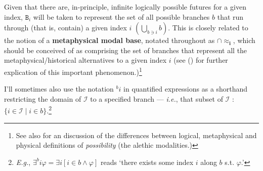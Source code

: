 \documentclass[12pt,dvipsnames]{report}
\begin{document}
\xe


Given that there are, in-principle, infinite logically possible futures for a given index,  $ \mathtt{B}_i $ will be taken to represent the set of all possible branches $ b $ that run through (that is, contain) a given index $ i $ $(\bigcup\limits_{b\scriptstyle\ni i}b)$. This is closely related to the notion of a \textbf{metaphysical modal base}, notated throughout as $ \boldsymbol{\cap{\approx_i}} $, which should be conceived of as comprising the set of branches that represent all the metaphysical/historical alternatives to a given index $ i $ (see () for further explication of this important phenomenon.)\footnote{See also \citet{Rumberg2016a} for an discussion of the differences between logical, metaphysical and physical definitions of \textit{possibility} (the alethic modalities.)}

 I'll sometimes also use the notation $ {}^bi $ in quantified expressions as a shorthand restricting the domain of $ \mathcal I $ to a specified branch --- \textit{i.e.}, that subset of $ \mathcal I $ : $ \{i\in\mathcal I\mid i\in b\} $.\footnote{\textit{E.g.}, $ \exists^bi\varphi=\exists i[i\in b\wedge\varphi]$ reads `there exists some index $ i $ along $ b $ s.t. $ \varphi $.'}
\end{document}

